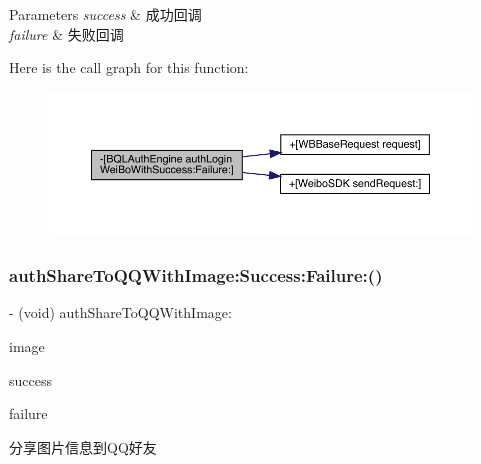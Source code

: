 \begin{DoxyParams}{Parameters}
{\em success} & 成功回调 \\
\hline
{\em failure} & 失败回调 \\
\hline
\end{DoxyParams}
Here is the call graph for this function\+:\nopagebreak
\begin{figure}[H]
\begin{center}
\leavevmode
\includegraphics[width=350pt]{interface_b_q_l_auth_engine_ae9a00b2bcc82ed659282621120821eda_cgraph}
\end{center}
\end{figure}
\mbox{\label{interface_b_q_l_auth_engine_a5059fb2c57270d5dc2ada800ab69e22a}} 
\subsubsection{\texorpdfstring{auth\+Share\+To\+Q\+Q\+With\+Image\+:\+Success\+:\+Failure\+:()}{authShareToQQWithImage:Success:Failure:()}}
{\footnotesize\ttfamily -\/ (void) auth\+Share\+To\+Q\+Q\+With\+Image\+: \begin{DoxyParamCaption}\item[{(U\+I\+Image $\ast$)}]{image }\item[{Success:(B\+Q\+L\+Auth\+Success\+Block)}]{success }\item[{Failure:(B\+Q\+L\+Auth\+Failure\+Block)}]{failure }\end{DoxyParamCaption}}

分享图片信息到\+Q\+Q好友


